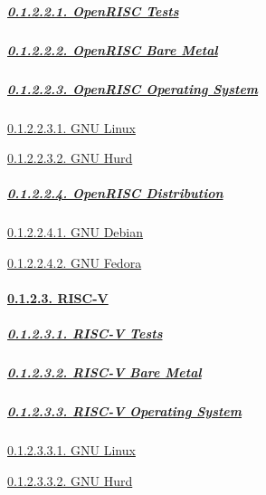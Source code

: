 \documentclass[
]{article}
\begin{document}
\hypertarget{openrisc-tests}{%
\subparagraph{\texorpdfstring{\protect\hyperlink{openrisc-tests-1}{0.1.2.2.1.
OpenRISC Tests}}{0.1.2.2.1. OpenRISC Tests}}\label{openrisc-tests}}

\hypertarget{openrisc-bare-metal}{%
\subparagraph{\texorpdfstring{\protect\hyperlink{openrisc-bare-metal-1}{0.1.2.2.2.
OpenRISC Bare
Metal}}{0.1.2.2.2. OpenRISC Bare Metal}}\label{openrisc-bare-metal}}

\hypertarget{openrisc-operating-system}{%
\subparagraph{\texorpdfstring{\protect\hyperlink{openrisc-operating-system-1}{0.1.2.2.3.
OpenRISC Operating
System}}{0.1.2.2.3. OpenRISC Operating System}}\label{openrisc-operating-system}}

\protect\hyperlink{gnu-linux-4}{0.1.2.2.3.1. GNU Linux}

\protect\hyperlink{gnu-hurd-4}{0.1.2.2.3.2. GNU Hurd}

\hypertarget{openrisc-distribution}{%
\subparagraph{\texorpdfstring{\protect\hyperlink{openrisc-distribution-1}{0.1.2.2.4.
OpenRISC
Distribution}}{0.1.2.2.4. OpenRISC Distribution}}\label{openrisc-distribution}}

\protect\hyperlink{gnu-debian-4}{0.1.2.2.4.1. GNU Debian}

\protect\hyperlink{gnu-fedora-4}{0.1.2.2.4.2. GNU Fedora}

\hypertarget{risc-v}{%
\paragraph{\texorpdfstring{\protect\hyperlink{risc-v-3}{0.1.2.3.
RISC-V}}{0.1.2.3. RISC-V}}\label{risc-v}}

\hypertarget{risc-v-tests}{%
\subparagraph{\texorpdfstring{\protect\hyperlink{risc-v-tests-1}{0.1.2.3.1.
RISC-V Tests}}{0.1.2.3.1. RISC-V Tests}}\label{risc-v-tests}}

\hypertarget{risc-v-bare-metal}{%
\subparagraph{\texorpdfstring{\protect\hyperlink{risc-v-bare-metal-1}{0.1.2.3.2.
RISC-V Bare
Metal}}{0.1.2.3.2. RISC-V Bare Metal}}\label{risc-v-bare-metal}}

\hypertarget{risc-v-operating-system}{%
\subparagraph{\texorpdfstring{\protect\hyperlink{risc-v-operating-system-1}{0.1.2.3.3.
RISC-V Operating
System}}{0.1.2.3.3. RISC-V Operating System}}\label{risc-v-operating-system}}

\protect\hyperlink{gnu-linux-5}{0.1.2.3.3.1. GNU Linux}

\protect\hyperlink{gnu-hurd-5}{0.1.2.3.3.2. GNU Hurd}
\end{document}
